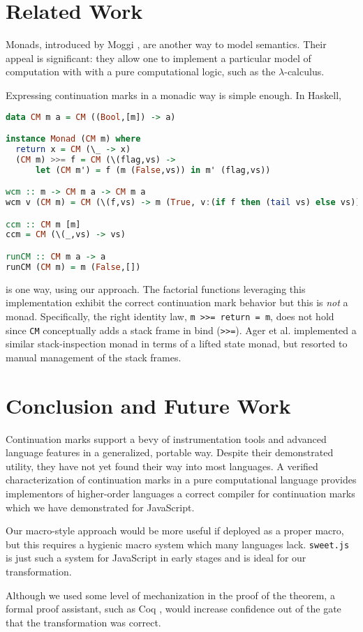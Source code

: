 \documentclass{llncs}
\newcommand{\lc}[0]{$\lambda$-calculus}
\begin{document}
\section{Related Work}

Monads, introduced by Moggi \cite{moggi1989computational}, are another way to model semantics. Their appeal is significant: they allow one to implement a particular model of computation with with a pure computational logic, such as the \lc.

Expressing continuation marks in a monadic way is simple enough. In Haskell,
\begin{minipage}{\linewidth}
\begin{lstlisting}[language=Haskell]
data CM m a = CM ((Bool,[m]) -> a)

instance Monad (CM m) where
  return x = CM (\_ -> x)
  (CM m) >>= f = CM (\(flag,vs) ->
      let (CM m') = f (m (False,vs)) in m' (flag,vs))

wcm :: m -> CM m a -> CM m a
wcm v (CM m) = CM (\(f,vs) -> m (True, v:(if f then (tail vs) else vs)))

ccm :: CM m [m]
ccm = CM (\(_,vs) -> vs)

runCM :: CM m a -> a
runCM (CM m) = m (False,[])
\end{lstlisting}
\end{minipage}
is one way, using our approach. The factorial functions leveraging this implementation exhibit the correct continuation mark behavior but this is \emph{not} a monad. Specifically, the right identity law, \texttt{{\color{gray}m} >>= {\color{RoyalBlue}return} = {\color{gray}m}}, does not hold since \texttt{{\color{gray}CM}} conceptually adds a stack frame in bind (\texttt{>>=}). Ager et al. \cite{ager2003functional} implemented a similar stack-inspection monad in terms of a lifted state monad, but resorted to manual management of the stack frames.

\section{Conclusion and Future Work}

Continuation marks support a bevy of instrumentation tools and advanced language features in a generalized, portable way. Despite their demonstrated utility, they have not yet found their way into most languages. A verified characterization of continuation marks in a pure computational language provides implementors of higher-order languages a correct compiler for continuation marks which we have demonstrated for JavaScript.

Our macro-style approach would be more useful if deployed as a proper macro, but this requires a hygienic macro system which many languages lack. \texttt{sweet.js} is just such a system for JavaScript in early stages and is ideal for our transformation.

Although we used some level of mechanization in the proof of the theorem, a formal proof assistant, such as Coq \cite{barras1997coq}, would increase confidence out of the gate that the transformation was correct.



\end{document}

